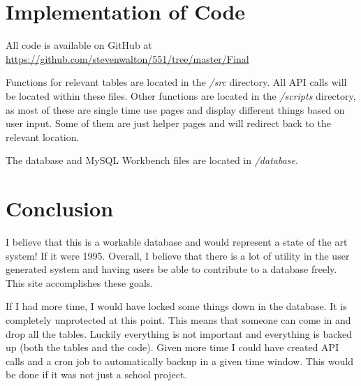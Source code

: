 \documentclass[12pt,letter]{article}
\begin{document}
\section{Implementation of Code}\label{sec:imp}
All code is available on GitHub at
\href{https://github.com/stevenwalton/551/tree/master/Final}{https://github.com/stevenwalton/551/tree/master/Final}

Functions for relevant tables are located in the \textit{/src} directory. All
API calls will be located within these files. Other
functions are located in the \textit{/scripts} directory, as most of these are
single time use pages and display different things based on user input. Some of
them are just helper pages and will redirect back to the relevant location.

The database and MySQL Workbench files are located in \textit{/database}.

\section{Conclusion}\label{sec:con}
I believe that this is a workable database and would represent a state of the
art system! If it were 1995. Overall, I believe that there is a lot of utility
in the user generated system and having users be able to contribute to a
database freely. This site accomplishes these goals.

If I had more time, I would have locked some things down in the database. It is
completely unprotected at this point. This means that someone can come in and
drop all the tables. Luckily everything is not important and everything is
backed up (both the tables and the code). Given more time I could have created
API calls and a cron job to automatically backup in a given time window. This
would be done if it was not just a school project. 
\end{document}
